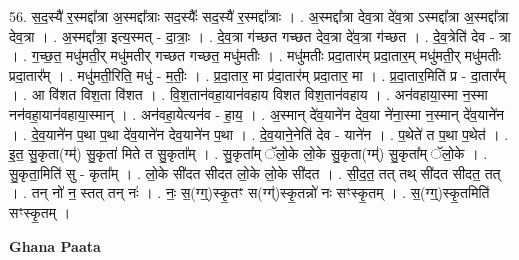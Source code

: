 \documentclass[17pt]{extarticle}
\begin{document}
56. स॒द॒स्यै॑ र॒स्मद्दा᳚त्रा अ॒स्मद्दा᳚त्राः सद॒स्यैः᳚ सद॒स्यै॑ र॒स्मद्दा᳚त्राः । . अ॒स्मद्दा᳚त्रा देव॒त्रा दे॑व॒त्रा ऽस्मद्दा᳚त्रा अ॒स्मद्दा᳚त्रा देव॒त्रा । . अ॒स्मद्दा᳚त्रा॒ इत्य॒स्मत् - दा॒त्राः॒ । . दे॒व॒त्रा ग॑च्छत गच्छत देव॒त्रा दे॑व॒त्रा ग॑च्छत । . दे॒व॒त्रेति॑ देव - त्रा । . ग॒च्छ॒त॒ मधु॑मती॒र् मधु॑मतीर् गच्छत गच्छत॒ मधु॑मतीः । . मधु॑मतीः प्रदा॒तार॑म् प्रदा॒तार॒म् मधु॑मती॒र् मधु॑मतीः प्रदा॒तार᳚म् । . मधु॑मती॒रिति॒ मधु॑ - म॒तीः॒ । . प्र॒दा॒तार॒ मा प्र॑दा॒तार॑म् प्रदा॒तार॒ मा । . प्र॒दा॒तार॒मिति॑ प्र - दा॒तार᳚म् । . आ वि॑शत विश॒ता वि॑शत । . वि॒श॒तान॑वहा॒यान॑वहाय विशत विश॒तान॑वहाय । . अन॑वहाया॒स्मा न॒स्मा नन॑वहा॒यान॑वहाया॒स्मान् । . अन॑वहा॒येत्यन॑व - हा॒य॒ । . अ॒स्मान् दे॑व॒याने॑न देव॒या ने॑ना॒स्मा न॒स्मान् दे॑व॒याने॑न । . दे॒व॒याने॑न प॒था प॒था दे॑व॒याने॑न देव॒याने॑न प॒था । . दे॒व॒याने॒नेति॑ देव - याने॑न । . प॒थेते॑ त प॒था प॒थेत॑ । . इ॒त॒ सु॒कृता(ग्म्॑) सु॒कृता॑ मिते त सु॒कृता᳚म् । . सु॒कृता᳚म् ॅलो॒के लो॒के सु॒कृता(ग्म्॑) सु॒कृता᳚म् ॅलो॒के । . सु॒कृता॒मिति॑ सु - कृता᳚म् । . लो॒के सी॑दत सीदत लो॒के लो॒के सी॑दत । . सी॒द॒त॒ तत् तथ् सी॑दत सीदत॒ तत् । . तन् नो॑ न॒ स्तत् तन् नः॑ । . नः॒ स॒(ग्ग्॒)स्कृ॒तꣳ स(ग्ग्॑)स्कृ॒तन्नो॑ नः सꣳस्कृ॒तम् । . स॒(ग्ग्॒)स्कृ॒तमिति॑ सꣳस्कृ॒तम् । \newline

\textbf{Ghana Paata } \newline
\end{document}
